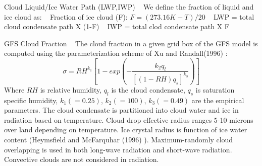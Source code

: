 \begin{DoxyEnumerate}
\item Cloud Liquid/\+Ice Water Path (L\+WP,I\+WP) ~\newline
 We define the fraction of liquid and ice cloud as\+: ~\newline
 Fraction of ice cloud (F)\+: $F=(273.16K-T)/20$ ~\newline
 L\+WP = total cloud condensate path X (1-\/F) ~\newline
 I\+WP = total clod condensate path X F
\item G\+FS Cloud Fraction ~\newline
 The cloud fraction in a given grid box of the G\+FS model is computed using the parameterization scheme of Xu and Randall(1996) \cite{xu_and_randall_1996} \+: \[ \sigma =RH^{k_{1}}\left[1-exp\left(-\frac{k_{2}q_{l}}{\left[\left(1-RH\right)q_{s}\right]^{k_{3}}}\right)\right] \] Where $RH$ is relative humidity, $q_{l}$ is the cloud condensate, $q_{s}$ is saturation specific humidity, $k_{1}(=0.25)$, $k_{2}(=100)$, $k_{3}(=0.49)$ are the empirical parameters. The cloud condensate is partitioned into cloud water and ice in radiation based on temperature. Cloud drop effective radius ranges 5-\/10 microns over land depending on temperature. Ice crystal radius is function of ice water content (Heymsfield and Mc\+Farquhar (1996) \cite{heymsfield_and_mcfarquhar_1996}). Maximum-\/randomly cloud overlapping is used in both long-\/wave radiation and short-\/wave radiation. Convective clouds are not considered in radiation. ~\newline


\end{DoxyEnumerate}
